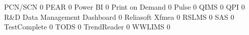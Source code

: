 \documentclass{article}
\begin{document}
\begin{Schunk}
\begin{Soutput}
  PCN/SCN                                                                  0
  PEAR                                                                     0
  Power BI                                                                 0
  Print on Demand                                                          0
  Pulse                                                                    0
  QIMS                                                                     0
  QPI                                                                      0
  R&D Data Management Dashboard                                            0
  Reliasoft Xfmea                                                          0
  RSLMS                                                                    0
  SAS                                                                      0
  TestComplete                                                             0
  TODS                                                                     0
  TrendReader                                                              0
  WWLIMS                                                                   0
                                                           

\end{Soutput}
\end{Schunk}
\end{document}
